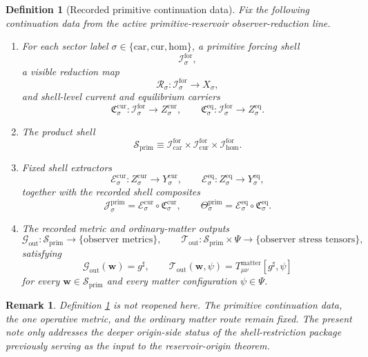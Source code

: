 \documentclass[11pt]{article}
\newcommand{\CompletedMetric}{g^{\sharp}}
\newcommand{\Car}{\mathrm{car}}
\newcommand{\Cur}{\mathrm{cur}}
\newcommand{\Hom}{\mathrm{hom}}
\newcommand{\ForSpace}[1]{\mathcal I_{#1}^{\mathrm{for}}}
\newcommand{\PrimShell}{\mathcal S_{\mathrm{prim}}}
\newcommand{\Reduction}[1]{\mathcal R_{#1}}
\newcommand{\CurrentCarrier}[1]{\mathfrak C_{#1}^{\mathrm{cur}}}
\newcommand{\EqCarrier}[1]{\mathfrak C_{#1}^{\mathrm{eq}}}
\newcommand{\CurrentExtract}[1]{\mathscr E_{#1}^{\mathrm{cur}}}
\newcommand{\EqExtract}[1]{\mathscr E_{#1}^{\mathrm{eq}}}
\newcommand{\PrimCurrent}[1]{\mathcal J_{#1}^{\mathrm{prim}}}
\newcommand{\PrimTheta}[1]{\Theta_{#1}^{\mathrm{prim}}}
\newcommand{\MetricOut}{\mathscr G_{\mathrm{out}}}
\newcommand{\MatterOut}{\mathscr T_{\mathrm{out}}}
\newtheorem{definition}{Definition}
\newtheorem{remark}{Remark}
\begin{document}
\begin{definition}[Recorded primitive continuation data]
\label{def:fixed}
Fix the following continuation data from the active primitive-reservoir observer-reduction line.
\begin{enumerate}
    \item For each sector label \(\sigma\in\{\Car,\Cur,\Hom\}\), a primitive forcing shell
    \[
    \ForSpace{\sigma},
    \]
    a visible reduction map
    \[
    \Reduction{\sigma}:\ForSpace{\sigma}\to X_{\sigma},
    \]
    and shell-level current and equilibrium carriers
    \[
    \CurrentCarrier{\sigma}:\ForSpace{\sigma}\to Z_{\sigma}^{\mathrm{cur}},
    \qquad
    \EqCarrier{\sigma}:\ForSpace{\sigma}\to Z_{\sigma}^{\mathrm{eq}}.
    \]
    \item The product shell
    \[
    \PrimShell
    \equiv
    \ForSpace{\Car}\times \ForSpace{\Cur}\times \ForSpace{\Hom}.
    \]
    \item Fixed shell extractors
    \[
    \CurrentExtract{\sigma}:Z_{\sigma}^{\mathrm{cur}}\to Y_{\sigma}^{\mathrm{cur}},
    \qquad
    \EqExtract{\sigma}:Z_{\sigma}^{\mathrm{eq}}\to Y_{\sigma}^{\mathrm{eq}},
    \]
    together with the recorded shell composites
    \begin{equation}
    \PrimCurrent{\sigma}
    =
    \CurrentExtract{\sigma}\circ \CurrentCarrier{\sigma},
    \qquad
    \PrimTheta{\sigma}
    =
    \EqExtract{\sigma}\circ \EqCarrier{\sigma}.
    \label{eq:primcomposites}
    \end{equation}
    \item The recorded metric and ordinary-matter outputs
    \[
    \MetricOut:\PrimShell\to\{\text{observer metrics}\},
    \qquad
    \MatterOut:\PrimShell\times\Psi\to\{\text{observer stress tensors}\},
    \]
    satisfying
    \begin{equation}
    \MetricOut(\mathbf w)=\CompletedMetric,
    \qquad
    \MatterOut(\mathbf w,\psi)
    =
    T_{\mu\nu}^{\mathrm{matter}}[\CompletedMetric,\psi]
    \label{eq:fixedoutputs}
    \end{equation}
    for every \(\mathbf w\in\PrimShell\) and every matter configuration \(\psi\in\Psi\).
\end{enumerate}
\end{definition}

\begin{remark}
Definition \ref{def:fixed} is not reopened here. The primitive continuation data, the one operative metric, and the ordinary matter route remain fixed. The present note only addresses the deeper origin-side status of the shell-restriction package previously serving as the input to the reservoir-origin theorem.
\end{remark}
\end{document}

